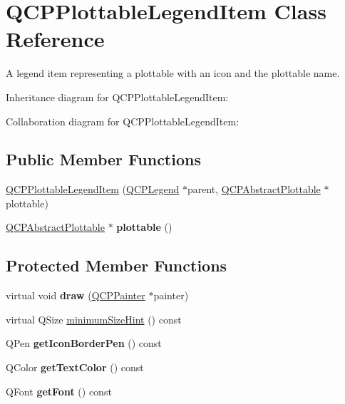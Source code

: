 \hypertarget{classQCPPlottableLegendItem}{}\section{Q\+C\+P\+Plottable\+Legend\+Item Class Reference}
\label{classQCPPlottableLegendItem}


A legend item representing a plottable with an icon and the plottable name.  




Inheritance diagram for Q\+C\+P\+Plottable\+Legend\+Item\+:


Collaboration diagram for Q\+C\+P\+Plottable\+Legend\+Item\+:
\subsection*{Public Member Functions}
\begin{DoxyCompactItemize}
\item 
\hyperlink{classQCPPlottableLegendItem_ac1072591fe409d3dabad51b23ee4d6c5}{Q\+C\+P\+Plottable\+Legend\+Item} (\hyperlink{classQCPLegend}{Q\+C\+P\+Legend} $\ast$parent, \hyperlink{classQCPAbstractPlottable}{Q\+C\+P\+Abstract\+Plottable} $\ast$plottable)
\item 
\hyperlink{classQCPAbstractPlottable}{Q\+C\+P\+Abstract\+Plottable} $\ast$ {\bfseries plottable} ()\hypertarget{classQCPPlottableLegendItem_af29e9a2c60b4cba0cac2447b8af7b488}{}\label{classQCPPlottableLegendItem_af29e9a2c60b4cba0cac2447b8af7b488}

\end{DoxyCompactItemize}
\subsection*{Protected Member Functions}
\begin{DoxyCompactItemize}
\item 
virtual void {\bfseries draw} (\hyperlink{classQCPPainter}{Q\+C\+P\+Painter} $\ast$painter)\hypertarget{classQCPPlottableLegendItem_a68a781c3de4f9959fdf82075052d43aa}{}\label{classQCPPlottableLegendItem_a68a781c3de4f9959fdf82075052d43aa}

\item 
virtual Q\+Size \hyperlink{classQCPPlottableLegendItem_a76bad654ebc8e870392f488419a6a483}{minimum\+Size\+Hint} () const 
\item 
Q\+Pen {\bfseries get\+Icon\+Border\+Pen} () const \hypertarget{classQCPPlottableLegendItem_ab36270e6b022a6961fa44136f35c0e4b}{}\label{classQCPPlottableLegendItem_ab36270e6b022a6961fa44136f35c0e4b}

\item 
Q\+Color {\bfseries get\+Text\+Color} () const \hypertarget{classQCPPlottableLegendItem_ad762b07439c738660ba93e78c1d03667}{}\label{classQCPPlottableLegendItem_ad762b07439c738660ba93e78c1d03667}

\item 
Q\+Font {\bfseries get\+Font} () const \hypertarget{classQCPPlottableLegendItem_a8a85c8a25affb4895423d730164d61de}{}\label{classQCPPlottableLegendItem_a8a85c8a25affb4895423d730164d61de}

\end{DoxyCompactItemize}
